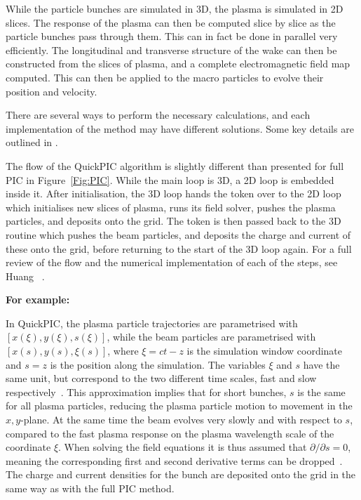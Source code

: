 While the particle bunches are simulated in 3D, the plasma is simulated in 2D slices.
The response of the plasma can then be computed slice by slice as the particle bunches pass through them.
This can in fact be done in parallel very efficiently.
The longitudinal and transverse structure of the wake can then be constructed from the slices of plasma, and a complete electromagnetic field map computed.
This can then be applied to the macro particles to evolve their position and velocity.

There are several ways to perform the necessary calculations, and each implementation of the method may have different solutions.
Some key details are outlined in \cite{vay:2016}.

The flow of the QuickPIC algorithm is slightly different than presented for full PIC in Figure~\ref{Fig:PIC}.
While the main loop is 3D, a 2D loop is embedded inside it.
After initialisation, the 3D loop hands the token over to the 2D loop which initialises new slices of plasma, runs its field solver, pushes the plasma particles, and deposits onto the grid.
The token is then passed back to the 3D routine which pushes the beam particles, and deposits the charge and current of these onto the grid, before returning to the start of the 3D loop again.
For a full review of the flow and the numerical implementation of each of the steps, see Huang \etal~\cite{huang:2006}.

\bigskip
\noindent\textbf{For example:}
\bigskip

In QuickPIC, the plasma particle trajectories are parametrised with $[x(\xi), y(\xi), s(\xi)]$, while the beam particles are parametrised with $[x(s),y(s),\xi(s)]$, where $\xi = ct - z$ is the simulation window coordinate and $s=z$ is the position along the simulation.
The variables $\xi$ and $s$ have the same unit, but correspond to the two different time scales, fast and slow respectively~\cite{huang:2006}.
This approximation implies that for short bunches, $s$ is the same for all plasma particles, reducing the plasma particle motion to movement in the $x,y$-plane.
At the same time the beam evolves very slowly and with respect to $s$, compared to the fast plasma response on the plasma wavelength scale of the coordinate $\xi$.
When solving the field equations it is thus assumed that $\partial/\partial s = 0$, meaning the corresponding first and second derivative terms can be dropped~\cite{an:2013}.
The charge and current densities for the bunch are deposited onto the grid in the same way as with the full PIC method.

